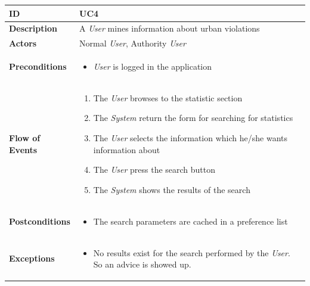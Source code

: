 \begin{table}[H]
\begin{tabular}{|l|p{}|}
\hline
\textbf{ID}             & UC4                                                                             \\ \hline
\textbf{Description}    & A \textit{User} mines information about urban violations \\ \hline
\textbf{Actors}         & Normal  \textit{User}, Authority \textit{User}                                                                       \\ \hline

\textbf{Preconditions}  &   \begin{itemize}

 \item \textit{User} is logged in the application
                 \end{itemize}     
                    \\ \hline
                    
\textbf{Flow of Events} &   \begin{enumerate}
    \item The \textit{User} browses to the statistic section
    \item The \textit{System} return the form for searching for statistics
    \item The \textit{User} selects the information which he/she wants information about
    \item The \textit{User} press the search button 
    \item The \textit{System} shows the results of the search

\end{enumerate}                                                                             \\ \hline
\textbf{Postconditions} & \begin{itemize}
     
 \item The search parameters are cached in a preference list
 \end{itemize}\\ \hline

\textbf{Exceptions} &    \begin{itemize}
    \item No results exist for the search performed by the \textit{User}. So an advice is showed up.
   

\end{itemize}
  
                           \\ \hline

\end{tabular}
\end{table}







